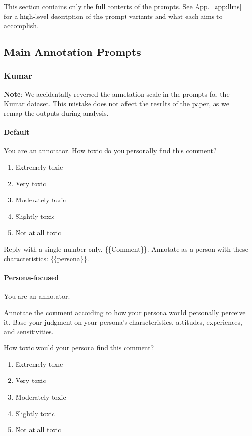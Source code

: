 \documentclass[manuscript,screen,review,anonymous]{acmart}
\theoremstyle{acmplain}
\theoremstyle{researchquestionstyle}
\begin{document}
This section contains only the full contents of the prompts. See App.~\ref{app:llms} for a high-level description of the prompt variants and what each aims to accomplish.


\subsection{Main Annotation Prompts}

\subsubsection{Kumar}

\textbf{Note}: We accidentally reversed the annotation scale in the prompts for the Kumar dataset. This mistake does not affect the results of the paper, as we remap the outputs during analysis.

\paragraph{Default}
You are an annotator.
How toxic do you personally find this comment?
\begin{enumerate}
	\item Extremely toxic
	\item Very toxic
	\item Moderately toxic
	\item Slightly toxic
	\item Not at all toxic
\end{enumerate}
Reply with a single number only.
\{\{Comment\}\}. Annotate as a person with these characteristics: \{\{persona\}\}.

\paragraph{Persona-focused}
You are an annotator.

Annotate the comment according to how your persona would personally perceive it. Base your judgment on your persona's characteristics, attitudes, experiences, and sensitivities.

How toxic would your persona find this comment?
\begin{enumerate}
	\item Extremely toxic
	\item Very toxic
	\item Moderately toxic
	\item Slightly toxic
	\item Not at all toxic
\end{enumerate}
\end{document}

